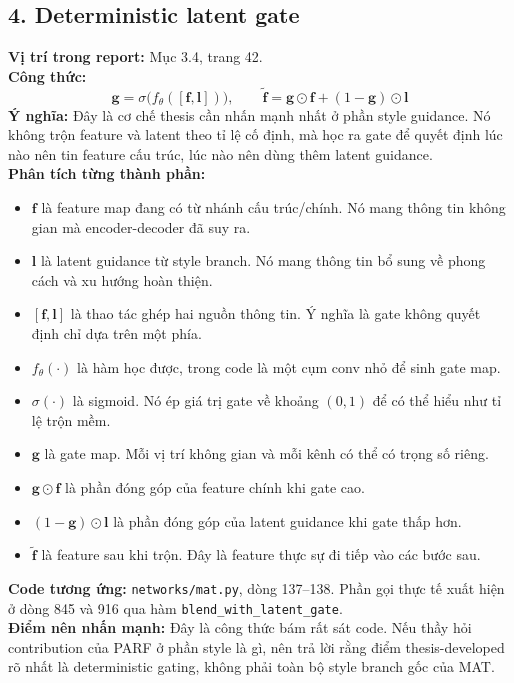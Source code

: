 \documentclass[12pt,a4paper]{article}
\begin{document}
\subsection*{4. Deterministic latent gate}
\textbf{Vị trí trong report:} Mục 3.4, trang 42.\\
\textbf{Công thức:}
\[
\mathbf{g} = \sigma\big(f_{\theta}([\mathbf{f}, \mathbf{l}])\big), \qquad
\tilde{\mathbf{f}} = \mathbf{g} \odot \mathbf{f} + (1-\mathbf{g}) \odot \mathbf{l}
\]
\textbf{Ý nghĩa:} Đây là cơ chế thesis cần nhấn mạnh nhất ở phần style guidance. Nó không trộn feature và latent theo tỉ lệ cố định, mà học ra gate để quyết định lúc nào nên tin feature cấu trúc, lúc nào nên dùng thêm latent guidance.\\
\textbf{Phân tích từng thành phần:}
\begin{itemize}[leftmargin=1.5em]
\item $\mathbf{f}$ là feature map đang có từ nhánh cấu trúc/chính. Nó mang thông tin không gian mà encoder-decoder đã suy ra.
\item $\mathbf{l}$ là latent guidance từ style branch. Nó mang thông tin bổ sung về phong cách và xu hướng hoàn thiện.
\item $[\mathbf{f},\mathbf{l}]$ là thao tác ghép hai nguồn thông tin. Ý nghĩa là gate không quyết định chỉ dựa trên một phía.
\item $f_{\theta}(\cdot)$ là hàm học được, trong code là một cụm conv nhỏ để sinh gate map.
\item $\sigma(\cdot)$ là sigmoid. Nó ép giá trị gate về khoảng $(0,1)$ để có thể hiểu như tỉ lệ trộn mềm.
\item $\mathbf{g}$ là gate map. Mỗi vị trí không gian và mỗi kênh có thể có trọng số riêng.
\item $\mathbf{g}\odot\mathbf{f}$ là phần đóng góp của feature chính khi gate cao.
\item $(1-\mathbf{g})\odot\mathbf{l}$ là phần đóng góp của latent guidance khi gate thấp hơn.
\item $\tilde{\mathbf{f}}$ là feature sau khi trộn. Đây là feature thực sự đi tiếp vào các bước sau.
\end{itemize}
\textbf{Code tương ứng:} \texttt{networks/mat.py}, dòng 137--138. Phần gọi thực tế xuất hiện ở dòng 845 và 916 qua hàm \texttt{blend\_with\_latent\_gate}.\\
\textbf{Điểm nên nhấn mạnh:} Đây là công thức bám rất sát code. Nếu thầy hỏi contribution của PARF ở phần style là gì, nên trả lời rằng điểm thesis-developed rõ nhất là deterministic gating, không phải toàn bộ style branch gốc của MAT.
\end{document}
